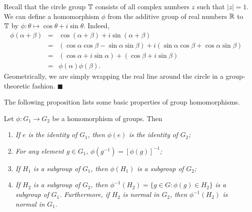  
\medskip
 
 
Recall that the circle group ${ \Bbb T}$ consists of all complex
numbers $z$ such that $|z|=1$. We can define a homomorphism $\phi$
from the additive group of real numbers ${\Bbb R}$ to ${\Bbb T}$ by
$\phi : \theta \mapsto \cos \theta + i \sin \theta$. Indeed, 
\begin{eqnarray*}
\phi( \alpha + \beta )
& = &
\cos( \alpha + \beta ) + i \sin( \alpha + \beta ) \\
& = &
(\cos \alpha \cos \beta - \sin \alpha \sin \beta)  + i( \sin \alpha 
\cos \beta + \cos \alpha \sin \beta ) \\
& = &
(\cos \alpha + i \sin \alpha ) + (\cos \beta + i \sin \beta
) \\
& = & \phi( \alpha ) \phi( \beta ).
\end{eqnarray*}
Geometrically, we are simply wrapping the real line around the circle 
in a group-theoretic fashion. 
\hspace{\fill} $\blacksquare$
 
 
\medskip
 
The following proposition lists some basic properties of group
homomorphisms.
 
 
\begin{proposition}
Let $\phi : G_1 \rightarrow G_2$ be a homomorphism of groups. Then 
\begin{enumerate}
 
\rm \item \it
If $e$ is the identity of $G_1$, then $\phi( e)$ is the identity of
$G_2$;  
 
\rm \item \it
For any element $g \in G_1$, $\phi( g^{-1}) = [\phi( g )]^{- 1}$;
 
\rm \item \it
If $H_1$ is a subgroup of $G_1$, then $\phi( H_1 )$ is a subgroup of
$G_2$;
 
\rm \item \it
If $H_2$ is a  subgroup of $G_2$, then $\phi^{-1}(H_2) = \{ g \in G :
\phi(g) \in H_2 \}$ is a subgroup of $G_1$. Furthermore, if $H_2$ is
normal in $G_2$, then $\phi^{-1}(H_2)$ is normal in $G_1$. 
 
\end{enumerate}
\end{proposition}
 
